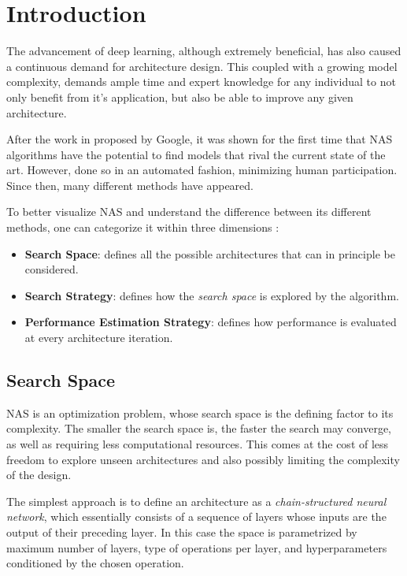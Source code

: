 \documentclass[10pt,        %
               a4paper,     %
               journal,     %
               ]{IEEEtran}
\begin{document}
\section{Introduction}
The advancement of deep learning, although extremely beneficial, has also caused a continuous demand for
architecture design. This coupled with a growing model complexity, demands ample time and expert knowledge for
any individual to not only benefit from it's application, but also be able to improve any given architecture.

After the work in \cite{zoph2016neural} proposed by Google, it was shown for the first time that NAS algorithms
have the potential to find models that rival the current state of the art. However, done so in an automated fashion, minimizing
human participation. Since then, many different methods have appeared.

To better visualize NAS and understand the difference between its different methods,
one can categorize it within three dimensions \cite{wistuba2019survey}:
\begin{itemize}
    \item \textbf{Search Space}: defines all the possible architectures that can in principle be considered.

    \item \textbf{Search Strategy}: defines how the \textit{search space} is explored by the algorithm.

    \item \textbf{Performance Estimation Strategy}: defines how performance is evaluated at every architecture iteration.
\end{itemize}

\subsection{Search Space}
NAS is an optimization problem, whose search space is the defining factor to its complexity.
The smaller the search space is, the faster the search may converge,
as well as requiring less computational resources. This comes at the cost of less freedom to
explore unseen architectures and also possibly limiting the complexity of the design.

The simplest approach is to define an architecture as a \textit{chain-structured neural network}, which essentially consists of a
sequence of layers whose inputs are the output of their preceding layer. In this case the space is parametrized by maximum number
of layers, type of operations per layer, and hyperparameters conditioned by the chosen operation.
\end{document}

